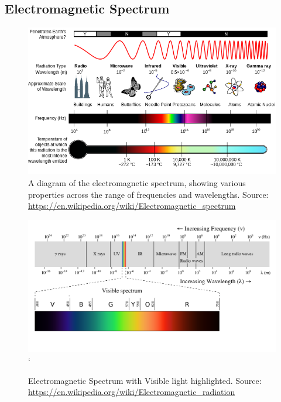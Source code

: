 \documentclass{article}
\begin{document}
\subsection{Electromagnetic Spectrum}

\begin{figure}[!ht]    
\centering
\includegraphics[width=\textwidth]{figures/EM_Spectrum_Properties_edit.png}
\caption{A diagram of the electromagnetic spectrum, showing various properties across the range of frequencies and wavelengths. Source: \url{https://en.wikipedia.org/wiki/Electromagnetic_spectrum}}
\label{fig:spectrum1}
\end{figure}

\begin{figure}[h!]    
\centering
\includegraphics[width=\linewidth]{figures/EM_spectrumrevised.png}`
\caption{Electromagnetic Spectrum with Visible light highlighted. Source: \url{https://en.wikipedia.org/wiki/Electromagnetic_radiation}}
\label{fig:spectrum2}
\end{figure}
\end{document}
